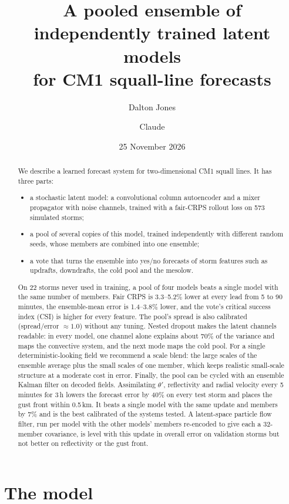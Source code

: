 \documentclass[11pt]{article}
\title{A pooled ensemble of independently trained latent models\\ for CM1 squall-line forecasts}
\author{Dalton Jones \and Claude}
\date{25 November 2026}
\begin{document}
\maketitle

\begin{abstract}
We describe a learned forecast system for two-dimensional CM1 squall lines. It has three parts:
\begin{itemize}
\item a stochastic latent model: a convolutional column autoencoder and a mixer propagator with noise channels, trained with a fair-CRPS rollout loss on 573 simulated storms;
\item a pool of several copies of this model, trained independently with different random seeds, whose members are combined into one ensemble;
\item a vote that turns the ensemble into yes/no forecasts of storm features such as updrafts, downdrafts, the cold pool and the mesolow.
\end{itemize}
On 22 storms never used in training, a pool of four models beats a single model with the same number of members. Fair CRPS is 3.3--5.2\% lower at every lead from 5 to 90 minutes, the ensemble-mean error is 1.4--3.8\% lower, and the vote's critical success index (CSI) is higher for every feature. The pool's spread is also calibrated (spread/error $\approx 1.0$) without any tuning. Nested dropout makes the latent channels readable: in every model, one channel alone explains about 70\% of the variance and maps the convective system, and the next mode maps the cold pool. For a single deterministic-looking field we recommend a scale blend: the large scales of the ensemble average plus the small scales of one member, which keeps realistic small-scale structure at a moderate cost in error. Finally, the pool can be cycled with an ensemble Kalman filter on decoded fields. Assimilating $\theta'$, reflectivity and radial velocity every 5 minutes for 3\,h lowers the forecast error by 40\% on every test storm and places the gust front within 0.5\,km. It beats a single model with the same update and members by 7\% and is the best calibrated of the systems tested. A latent-space particle flow filter, run per model with the other models' members re-encoded to give each a 32-member covariance, is level with this update in overall error on validation storms but not better on reflectivity or the gust front.
\end{abstract}

\section{The model}
\end{document}
